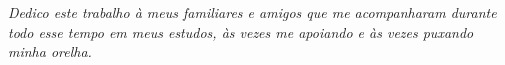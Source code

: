\newpage

\vspace*{22cm}

\hspace{8cm}\begin{minipage}{.60\textwidth}
            \textit{Dedico este trabalho à meus familiares e amigos que me acompanharam durante todo esse tempo em meus estudos, às vezes me apoiando e às vezes puxando minha orelha.}
            \end{minipage}